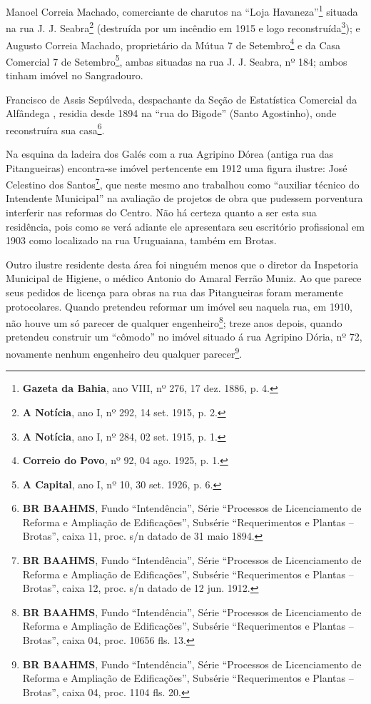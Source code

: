 Manoel Correia Machado, comerciante de charutos na ``Loja Havaneza''\footnote{\textbf{Gazeta da Bahia}, ano VIII, nº 276, 17 dez. 1886, p. 4.} situada na rua J. J. Seabra\footnote{\textbf{A Notícia}, ano I, nº 292, 14 set. 1915, p. 2.} (destruída por um incêndio em 1915 e logo reconstruída\footnote{\textbf{A Notícia}, ano I, nº 284, 02 set. 1915, p. 1.}); e Augusto Correia Machado, proprietário da Mútua 7 de Setembro\footnote{\textbf{Correio do Povo}, nº 92, 04 ago. 1925, p. 1.} e da Casa Comercial 7 de Setembro\footnote{\textbf{A Capital}, ano I, nº 10, 30 set. 1926, p. 6.}, ambas situadas na rua J. J. Seabra, nº 184; ambos tinham imóvel no Sangradouro. 

Francisco de Assis Sepúlveda, despachante da Seção de Estatística Comercial da Alfândega \cite[p.~306]{reis_almanak_1898}, residia desde 1894 na ``rua do Bigode'' (Santo Agostinho), onde reconstruíra sua casa\footnote{\textbf{BR BAAHMS}, Fundo ``Intendência'', Série ``Processos de Licenciamento de Reforma e Ampliação de Edificações'', Subsérie ``Requerimentos e Plantas -- Brotas'', caixa 11, proc. s/n datado de 31 maio 1894.}.

Na esquina da ladeira dos Galés com a rua Agripino Dórea (antiga rua das Pitangueiras) encontra-se imóvel pertencente em 1912 uma figura ilustre: José Celestino dos Santos\footnote{\textbf{BR BAAHMS}, Fundo ``Intendência'', Série ``Processos de Licenciamento de Reforma e Ampliação de Edificações'', Subsérie ``Requerimentos e Plantas -- Brotas'', caixa 12, proc. s/n datado de 12 jun. 1912.}, que neste mesmo ano trabalhou como ``auxiliar técnico do Intendente Municipal'' na avaliação de projetos de obra que pudessem porventura interferir nas reformas do Centro. Não há certeza quanto a ser esta sua residência, pois como se verá adiante ele apresentara seu escritório profissional em 1903 como localizado na rua Uruguaiana, também em Brotas.

Outro ilustre residente desta área foi ninguém menos que o diretor da Inspetoria Municipal de Higiene, o médico Antonio do Amaral Ferrão Muniz. Ao que parece seus pedidos de licença para obras na rua das Pitangueiras foram meramente protocolares. Quando pretendeu reformar um imóvel seu naquela rua, em 1910, não houve um só parecer de qualquer engenheiro\footnote{\textbf{BR BAAHMS}, Fundo ``Intendência'', Série ``Processos de Licenciamento de Reforma e Ampliação de Edificações'', Subsérie ``Requerimentos e Plantas -- Brotas'', caixa 04, proc. 10656 fls. 13.}; treze anos depois, quando pretendeu construir um ``cômodo'' no imóvel situado á rua Agripino Dória, nº 72, novamente nenhum engenheiro deu qualquer parecer\footnote{\textbf{BR BAAHMS}, Fundo ``Intendência'', Série ``Processos de Licenciamento de Reforma e Ampliação de Edificações'', Subsérie ``Requerimentos e Plantas -- Brotas'', caixa 04, proc. 1104 fls. 20.}.

